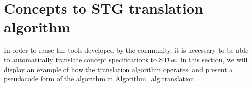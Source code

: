 \documentclass[british,conference,compsoc]{IEEEtran}
\newcommand{\noun}[1]{\textsc{#1}}
\begin{document}
%  
%
%  
%
%
%

\section{Concepts to STG translation algorithm\label{sec:algorithm}}

\vspace{-2mm}
%

In order to reuse the tools developed by the community, it is
necessary to be able to automatically translate concept specifications to STGs.
In this section, we will display an example of how the translation algorithm 
operates, and present a pseudocode form of the algorithm in 
Algorithm~\ref{alg:translation}. 
\end{document}
